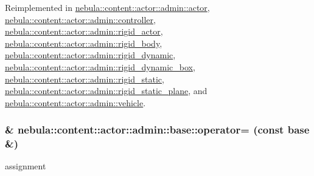 Reimplemented in \hyperlink{classnebula_1_1content_1_1actor_1_1admin_1_1actor_a36b8f2c3d8b0bab0a2a3540ec1bf693d}{nebula::content::actor::admin::actor}, \hyperlink{classnebula_1_1content_1_1actor_1_1admin_1_1controller_aaabeb54ec0f83d9b836562384a9a1f4d}{nebula::content::actor::admin::controller}, \hyperlink{classnebula_1_1content_1_1actor_1_1admin_1_1rigid__actor_a4de1558a31bb13bcf92279a4d823ddbb}{nebula::content::actor::admin::rigid\_\-actor}, \hyperlink{classnebula_1_1content_1_1actor_1_1admin_1_1rigid__body_a549b82effcb63341aa4057712446ce22}{nebula::content::actor::admin::rigid\_\-body}, \hyperlink{classnebula_1_1content_1_1actor_1_1admin_1_1rigid__dynamic_af30bd690cfa2d1a98b1458c658dc97d6}{nebula::content::actor::admin::rigid\_\-dynamic}, \hyperlink{classnebula_1_1content_1_1actor_1_1admin_1_1rigid__dynamic__box_a3d03f28e3ba455be0f39ad66e00c02c9}{nebula::content::actor::admin::rigid\_\-dynamic\_\-box}, \hyperlink{classnebula_1_1content_1_1actor_1_1admin_1_1rigid__static_a12aee11a228e35bd7a8b36ff411387a8}{nebula::content::actor::admin::rigid\_\-static}, \hyperlink{classnebula_1_1content_1_1actor_1_1admin_1_1rigid__static__plane_a5334403f326a185523ef2c7c380ffa8f}{nebula::content::actor::admin::rigid\_\-static\_\-plane}, and \hyperlink{classnebula_1_1content_1_1actor_1_1admin_1_1vehicle_affc4a941cb66e049f45e8de242c24535}{nebula::content::actor::admin::vehicle}.\hypertarget{classnebula_1_1content_1_1actor_1_1admin_1_1base_a96093c0d52eb68a36b3b80db30c2750c}{
\subsubsection[{operator=}]{\& nebula::content::actor::admin::base::operator= (const {\bf base} \&)}}
\label{classnebula_1_1content_1_1actor_1_1admin_1_1base_a96093c0d52eb68a36b3b80db30c2750c}


assignment 

